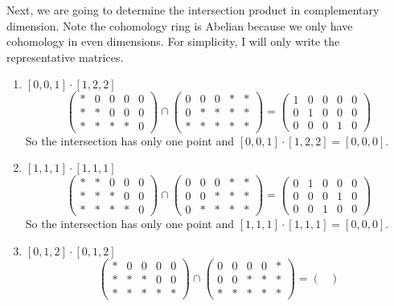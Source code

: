 \documentclass[letterpaper, 12pt]{article}
\begin{document}
\begin{solution}
Next, we are going to determine the intersection product in complementary dimension. Note the cohomology ring is Abelian because we only have cohomology in even dimensions. For simplicity, I will only write the representative matrices. 
\begin{enumerate}[(1)]
\item \([0,0,1]\cdot [1,2,2]\)\\ 
\[\begin{pmatrix}
   *&0&0&0&0\\ 
   *&*&0&0&0\\
   *&*&*&*&0
\end{pmatrix}\cap \begin{pmatrix}
   0&0&0&*&*\\
   0&*&*&*&*\\ 
   *&*&*&*&*
\end{pmatrix}=\begin{pmatrix}
   1&0&0&0&0\\ 
   0&1&0&0&0\\ 
   0&0&0&1&0
\end{pmatrix}\]
So the intersection has only one point and \([0,0,1]\cdot [1,2,2]=[0,0,0]\).
\item \([1,1,1]\cdot [1,1,1]\)
\[\begin{pmatrix}
   *&*&0&0&0\\ 
   *&*&*&0&0\\
   *&*&*&*&0
\end{pmatrix}\cap \begin{pmatrix}
   0&0&0&*&*\\
   0&0&*&*&*\\ 
   0&*&*&*&*
\end{pmatrix}=\begin{pmatrix}
   0&1&0&0&0\\ 
   0&0&0&1&0\\ 
   0&0&1&0&0
\end{pmatrix}\]
So the intersection has only one point and \([1,1,1]\cdot [1,1,1]=[0,0,0]\).
\item \([0,1,2]\cdot [0,1,2]\)
\[\begin{pmatrix}
   *&0&0&0&0\\ 
   *&*&*&0&0\\
   *&*&*&*&*
\end{pmatrix}\cap \begin{pmatrix}
   0&0&0&0&*\\
   0&0&*&*&*\\ 
   *&*&*&*&*
\end{pmatrix}=\begin{pmatrix}

\end{pmatrix}\]
\end{enumerate}
\end{solution}
\end{document}
